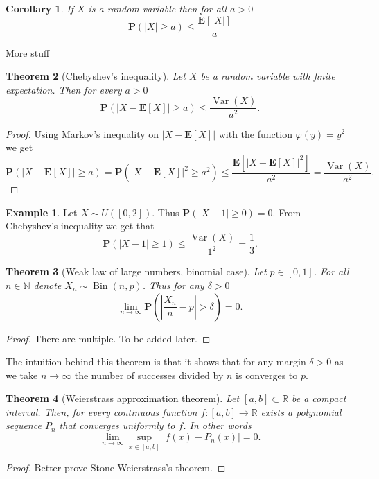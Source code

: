 \documentclass[11pt,a4paper]{article}
\theoremstyle{definition}
\newtheorem{example}{Example}[section]
\theoremstyle{plain}
\newtheorem{theorem}{Theorem}[section]
\newtheorem{corollary}[theorem]{Corollary}
\DeclareMathOperator{\Bin}{Bin}
\DeclareMathOperator{\Var}{Var}
\newcommand{\N}{\mathbb{N}}
\newcommand{\R}{\mathbb{R}}
\newcommand{\E}{\mathbf{E}}
\newcommand{\Prob}{\mathbf{P}}
\newcommand{\abs}[1]{\left\lvert #1\right\rvert}
\begin{document}
  \begin{corollary}
    If $X$ is a random variable then for all $a > 0$
    \[
      \Prob(|X|\geq a) \leq
      \frac{\E[|X|]}{a}
    \]
  \end{corollary}

  More stuff

  \begin{theorem}[Chebyshev's inequality]
    Let $X$ be a random variable with finite expectation. Then for every
    $a > 0$
    \[
      \Prob(\abs{X - \E[X]} \geq a) \le
      \frac{\Var(X)}{a^2}.
    \]
  \end{theorem}
  \begin{proof}
    Using Markov's inequality on $\abs{X - \E[X]}$ with the function
    $\varphi(y) = y^2$ we get
    \[
      \Prob(\abs{X-\E[X]} \geq a) =
      \Prob(\abs{X-\E[X]}^{2} \geq a^{2}) \leq
      \frac{\E\left[\abs{X-\E[X]}^{2}\right]}{a^{2}} =
      \frac{\Var(X)}{a^2}.
    \]
  \end{proof}

  \begin{example}
    Let $X \sim U([0,2])$. Thus $\Prob\left(\abs{X - 1} \geq 0\right) = 0$.
    From Chebyshev's inequality we get that
    \[
      \Prob\left(\abs{X - 1} \geq 1\right) \le
      \frac{\Var(X)}{1^2} =
      \frac{1}{3}.
    \]
  \end{example}

  \begin{theorem}[Weak law of large numbers, binomial case]
    Let $p \in [0,1]$. For all $n \in \N$ denote $X_n \sim \Bin(n,p)$.
    Thus for any $\delta > 0$
    \[
      \lim_{n \to \infty}
      \Prob\left(\abs{\frac{X_n}{n} - p} > \delta\right) =
      0.
    \]
  \end{theorem}
  \begin{proof}
    There are multiple. To be added later.
  \end{proof}

  The intuition behind this theorem is that it shows that for any margin
  $\delta > 0$ as we take $n \to \infty$ the number of successes divided
  by $n$ is converges to $p$.

  \begin{theorem}[Weierstrass approximation theorem]
    Let $[a,b] \subset \R$ be a compact interval. Then, for every continuous
    function $f \colon [a,b] \to \R$ exists a polynomial sequence $P_n$
    that converges uniformly to $f$. In other words
    \[
      \lim_{n \to \infty}
      \sup_{x \in [a,b]}
      \abs{f(x) - P_n(x)} =
      0.
    \]
  \end{theorem}
  \begin{proof}
    Better prove Stone-Weierstrass's theorem.
  \end{proof}
\end{document}
